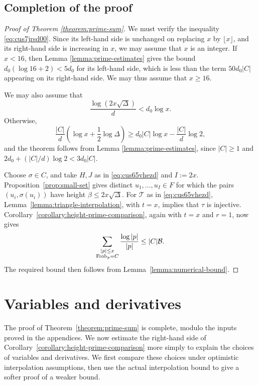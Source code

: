 \documentclass[reqno]{amsart} 
\begin{document}
\subsection{Completion of the proof}\label{sec:cus71nhevd}

\begin{proof}[Proof of Theorem \ref{theorem:prime-sum}]
  We must verify the inequality \eqref{eq:cus7jrsd00}.  Since its left-hand side is unchanged on replacing $x$ by $\lfloor x\rfloor$, and its right-hand side is increasing in $x$, we may assume that $x$ is an integer.  If $x < 16$, then Lemma \ref{lemma:prime-estimates} gives the bound $d_0(\log 16 + 2) < 5d_0$ for its left-hand side, which is less than the term $50d_0|C|$ appearing on its right-hand side.  We may thus assume that $x \geq 16$.

  We may also assume that
  \begin{equation}\label{eq:height-range}
    \frac{\log(2x\sqrt{\Delta})}{d} < d_0\log x.
  \end{equation}
  Otherwise,
  \begin{equation*}
    \frac{|C|}{d}\left(\log x + \frac12\log\Delta\right)
    \geq d_0|C|\log x - \frac{|C|}{d}\log 2,
  \end{equation*}
  and the theorem follows from Lemma \ref{lemma:prime-estimates}, since $|C| \geq 1$ and $2d_0 + (|C|/d)\log 2 < 3d_0|C|$.

  Choose $\sigma\in C$, and take $H, J$ as in \eqref{eq:cus65vhezd} and $I:=2x$.  Proposition~\ref{prop:small-set} gives distinct $u_1,\dotsc,u_I\in F$ for which the pairs $(u_i,\sigma(u_i))$ have height $\beta\leq2x\sqrt\Delta$.  For $\mathcal{T}$ as in \eqref{eq:cus65vhezd}, Lemma~\ref{lemma:triangle-interpolation}, with $t=x$, implies that $\tau$ is injective.  Corollary~\ref{corollary:height-prime-comparison}, again with $t=x$ and $r=1$, now gives
  \begin{equation*}
    \sum_{\substack{|p|\leq x\\\operatorname{Frob}_p=C}}\frac{\log|p|}{|p|}
    \leq |C|\mathcal{B}.
  \end{equation*}
  The required bound then follows from Lemma~\ref{lemma:numerical-bound}.
\end{proof}

\section{Variables and derivatives}\label{section:discussion}

The proof of Theorem~\ref{theorem:prime-sum} is complete, modulo the inputs proved in the appendices.  We now estimate the right-hand side of Corollary~\ref{corollary:height-prime-comparison} more simply to explain the choices of variables and derivatives.  We first compare these choices under optimistic interpolation assumptions, then use the actual interpolation bound to give a softer proof of a weaker bound.
\end{document}
